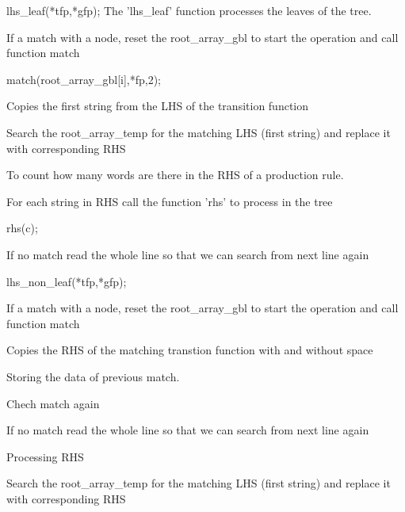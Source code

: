  lhs_leaf(*tfp,*gfp);
  The 'lhs_leaf' function processes the leaves of the tree.

   If a match with a node, reset the root_array_gbl to start the operation and call function match
                           

 match(root_array_gbl[i],*fp,2);

   Copies the first string from the LHS of the transition function
                               

  Search the root_array_temp for the matching LHS (first string) and replace it with corresponding RHS
                               

  To count how many words are there in the RHS of a production rule.
                                

  For each string in RHS call the function 'rhs' to process in the tree
                                   

   rhs(c);

  If no match read the whole line so that we can search from next line again
                           



 lhs_non_leaf(*tfp,*gfp);

    If a match with a node, reset the root_array_gbl to start the operation and call function match
                           

  Copies the RHS of the matching transtion function with and without space
                               

  Storing the data of previous match. 
                                                       

  Chech match again
                                                   


   If no match read the whole line so that we can search from next line again
                                                   

   Processing RHS


              Search the root_array_temp for the matching LHS (first string) and replace it with corresponding RHS
                   


